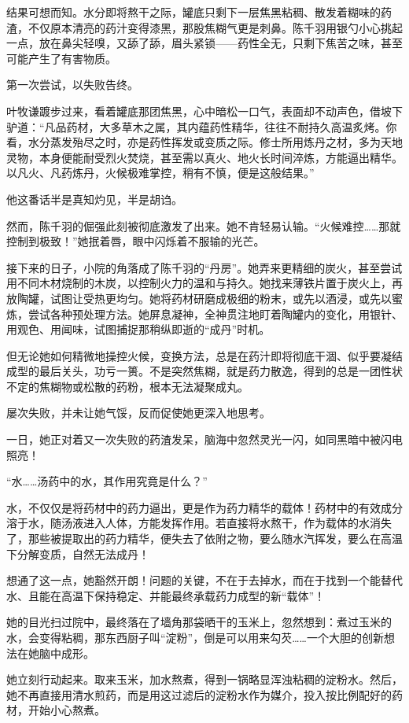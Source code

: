 结果可想而知。水分即将熬干之际，罐底只剩下一层焦黑粘稠、散发着糊味的药渣，不仅原本清亮的药汁变得漆黑，那股焦糊气更是刺鼻。陈千羽用银勺小心挑起一点，放在鼻尖轻嗅，又舔了舔，眉头紧锁——药性全无，只剩下焦苦之味，甚至可能产生了有害物质。

第一次尝试，以失败告终。

叶牧谦踱步过来，看着罐底那团焦黑，心中暗松一口气，表面却不动声色，借坡下驴道：“凡品药材，大多草木之属，其内蕴药性精华，往往不耐持久高温炙烤。你看，水分蒸发殆尽之时，亦是药性挥发或变质之际。修士所用炼丹之材，多为天地灵物，本身便能耐受烈火焚烧，甚至需以真火、地火长时间淬炼，方能逼出精华。以凡火、凡药炼丹，火候极难掌控，稍有不慎，便是这般结果。”

他这番话半是真知灼见，半是胡诌。

然而，陈千羽的倔强此刻被彻底激发了出来。她不肯轻易认输。“火候难控……那就控制到极致！”她抿着唇，眼中闪烁着不服输的光芒。

接下来的日子，小院的角落成了陈千羽的“丹房”。她弄来更精细的炭火，甚至尝试用不同木材烧制的木炭，以控制火力的温和与持久。她找来薄铁片置于炭火上，再放陶罐，试图让受热更均匀。她将药材研磨成极细的粉末，或先以酒浸，或先以蜜炼，尝试各种预处理方法。她屏息凝神，全神贯注地盯着陶罐内的变化，用银针、用观色、用闻味，试图捕捉那稍纵即逝的“成丹”时机。

但无论她如何精微地操控火候，变换方法，总是在药汁即将彻底干涸、似乎要凝结成型的最后关头，功亏一篑。不是突然焦糊，就是药力散逸，得到的总是一团性状不定的焦糊物或松散的药粉，根本无法凝聚成丸。

屡次失败，并未让她气馁，反而促使她更深入地思考。

一日，她正对着又一次失败的药渣发呆，脑海中忽然灵光一闪，如同黑暗中被闪电照亮！

“水……汤药中的水，其作用究竟是什么？”

水，不仅仅是将药材中的药力逼出，更是作为药力精华的载体！药材中的有效成分溶于水，随汤液进入人体，方能发挥作用。若直接将水熬干，作为载体的水消失了，那些被提取出的药力精华，便失去了依附之物，要么随水汽挥发，要么在高温下分解变质，自然无法成丹！

想通了这一点，她豁然开朗！问题的关键，不在于去掉水，而在于找到一个能替代水、且能在高温下保持稳定、并能最终承载药力成型的新“载体”！

她的目光扫过院中，最终落在了墙角那袋晒干的玉米上，忽然想到：煮过玉米的水，会变得粘稠，那东西厨子叫“淀粉”，倒是可以用来勾芡……一个大胆的创新想法在她脑中成形。

她立刻行动起来。取来玉米，加水熬煮，得到一锅略显浑浊粘稠的淀粉水。然后，她不再直接用清水煎药，而是用这过滤后的淀粉水作为媒介，投入按比例配好的药材，开始小心熬煮。

